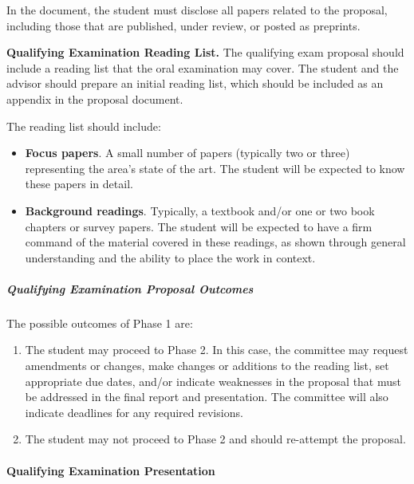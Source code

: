 In the document, the student must disclose all papers related to the proposal,
including those that are published, under review, or posted as preprints.


\textbf{Qualifying Examination Reading List.} The qualifying exam
proposal should include a reading list that the oral examination may
cover. The student and the advisor should prepare an initial reading list,
which should be included as an appendix in the proposal document.

The reading list should include:

\begin{itemize}[nosep]

\item \textbf{Focus papers}. A small number of papers (typically two or three)
representing the area's state of the art. The student will be expected
to know these papers in detail.

\item \textbf{Background readings}. Typically, a textbook and/or one or two
book chapters or survey papers. The student will be expected to have a
firm command of the material covered in these readings, as shown through
general understanding and the ability to place the work in context.

\end{itemize}

\hypertarget{qualifying-examination-depth-proposal-outcomes}{
\subparagraph{Qualifying Examination Proposal Outcomes}
\label{qualifying-examination-depth-proposal-outcomes}
}

The possible outcomes of Phase 1 are:

\begin{enumerate}[nosep]
    \item The student may proceed to Phase 2. In this case, the committee may
     request amendments or changes, make changes or additions to the reading
     list, set appropriate due dates, and/or indicate weaknesses in the
     proposal that must be addressed in the final report and presentation. The
     committee will also indicate deadlines for any required revisions.

    \item The student may not proceed to Phase 2 and should re-attempt the proposal.
\end{enumerate}


\hypertarget{qualifying-examination-presentation}{
\paragraph{Qualifying Examination Presentation}
\label{qualifying-examination-depth-defense}
}

